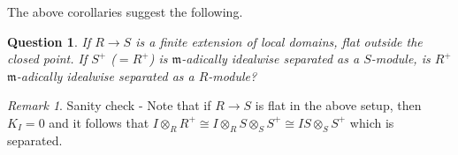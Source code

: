 \documentclass[12pt,reqno]{amsart}
\newtheorem{question}[theorem]{Question}
\theoremstyle{definition}
\theoremstyle{remark}
\newtheorem{remark}[theorem]{Remark}
\theoremstyle{cited}
\theoremstyle{remark}
\theoremstyle{citeddef}
\begin{document}
	The above corollaries suggest the following.
	
	\begin{question}
		If $R\to S$ is a finite extension of local domains, flat outside the closed point. If $S^{+}$ ($= R^{+}$) is $\mathfrak{m}$-adically idealwise separated as a $S$-module, is $R^{+}$ $\mathfrak{m}$-adically idealwise separated as a $R$-module?
	\end{question}
	
	\begin{remark}
		Sanity check - Note that if $R \to S$ is flat in the above setup, then $K_I = 0$ and it follows that $I \otimes_{R} R^{+} \cong I \otimes_{R} S \otimes_{S} S^{+} \cong IS \otimes_{S} S^{+}$ which is separated. 
	\end{remark}
	
	
	
\end{document}
